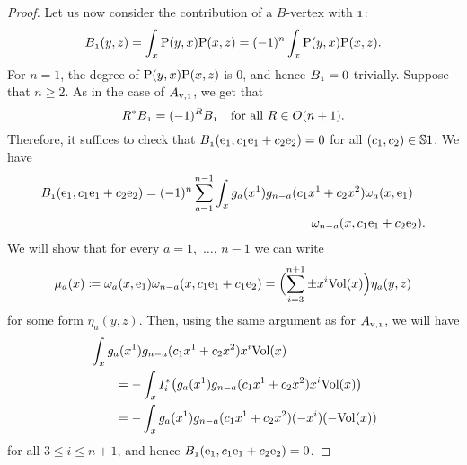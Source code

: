 \documentclass[\MainFolder/Text.tex]{subfiles}
\begin{document}
\begin{proof}
Let us now consider the contribution of a $B$-vertex with $\NOne$:
$$ B_{\NOne}(y,z) = \int_{x} \Prpg(y,x) \Prpg(x,z) = (-1)^n \int_x \Prpg(y,x) \Prpg(x,z). $$
For $n=1$, the degree of $\mathrm{P}(y,x)\mathrm{P}(x,z)$ is $0$, and hence $B_{\NOne}= 0$ trivially. Suppose that $n\ge 2$. As in the case of $A_{\NVol,\NOne}$, we get that 
$$ R^* B_{\NOne} = (-1)^R B_{\NOne} \quad\text{for all }R\in O(n+1). $$
Therefore, it suffices to check that $B_{\NOne}(\StdBasis_1, c_1 \StdBasis_1 + c_2 \StdBasis_2) = 0$ for all $(c_1,c_2)\in \mathbb{S}{1}$. We have
$$  B_{\NOne}(\StdBasis_1, c_1 \StdBasis_1 + c_2 \StdBasis_2) = \begin{multlined}[t] (-1)^n \sum_{a=1}^{n-1} \int_x g_a(x^1) g_{n-a}(c_1 x^1 + c_2 x^2)\omega_a(x,\StdBasis_1) \\ \omega_{n-a}(x,c_1 \StdBasis_1 + c_2 \StdBasis_2).\end{multlined}$$
We will show that for every $a=1$,~$\dotsc$, $n-1$ we can write
\begin{equation} \label{Eq:Mu}
\mu_a(x) \coloneqq \omega_a(x,\mathrm{e}_1) \omega_{n-a}(x,c_1 \mathrm{e}_1 + c_1 \mathrm{e}_2) = \Bigl(\sum_{i=3}^{n+1} \pm  x^i \mathrm{Vol}(x)\Bigr) \eta_a(y,z)
\end{equation}
for some form $\eta_a(y,z)$. Then, using the same argument as for $A_{\NVol,\NOne}$, we will have
$$\begin{aligned}
& \int_x  g_a(x^1) g_{n-a}(c_1 x^1 + c_2 x^2) x^i \mathrm{Vol}(x) \\
&\qquad = - \int_x I^*_i \bigl(g_a(x^1) g_{n-a}(c_1 x^1 + c_2 x^2) x^i \mathrm{Vol}(x)\bigr) \\
&\qquad = - \int_x g_a(x^1) g_{n-a}(c_1 x^1 + c_2 x^2) (-x^i) (-\mathrm{Vol}(x))
\end{aligned}$$
for all $3 \le i \le n+ 1$, and hence $B_{\NOne}(\StdBasis_1, c_1 \StdBasis_1 + c_2 \StdBasis_2) = 0$.


\end{proof}
\end{document}
